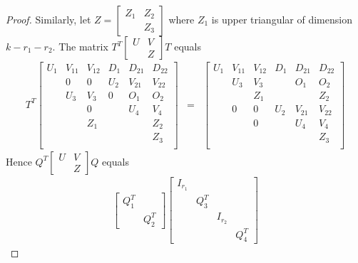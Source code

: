 \documentclass{article}
\begin{document}
\begin{proof}
Similarly, let $Z=
\begin{bmatrix}
  Z_1&Z_2\\&Z_3
\end{bmatrix}$
where $Z_1$ is upper triangular of dimension $k-r_1-r_2$.
The matrix $ T^T \begin{bmatrix}U&V \\&Z\end{bmatrix}T$ equals
\begin{eqnarray*}
  T^T \left[
        \begin{array}{ccc|cccc}
          U_1  & V_{11} & V_{12} &D_1 &D_{21}&D_{22}\\
                &0     & 0     &U_2 &V_{21}&V_{22}\\
                &U_3   & V_3    & 0   &O_1 & O_2\\
                &      & 0     &    & U_4& V_4\\
                &      & Z_1    &    &   & Z_2\\
                &      &        &    &   &Z_3\\
        \end{array}
      \right]
  &=& \left[
        \begin{array}{ccc|cccc}
          U_1  & V_{11} & V_{12} &D_1 &D_{21}&D_{22}\\
                &U_3   & V_3    &    &O_1 & O_2\\
                &      & Z_1    &    &   & Z_2\\
                &0     & 0     &U_2 &V_{21}&V_{22}\\
                &      & 0     &    & U_4& V_4\\
                &      &        &    &   &Z_3\\
        \end{array}
      \right]
\end{eqnarray*}
Hence $ Q^T\left[\begin{matrix}U&V \\&Z\end{matrix}\right]Q $ equals
  \begin{equation*}
    \begin{split}
 \begin{bmatrix} Q_1^T\\&Q_2^T\end{bmatrix}
    \begin{bmatrix} I_{r_1}\\&Q_3^T \\&&I_{r_2}\\&&&Q_4^T \end{bmatrix}

\end{split}
\end{equation*}
\end{proof}
\end{document}
